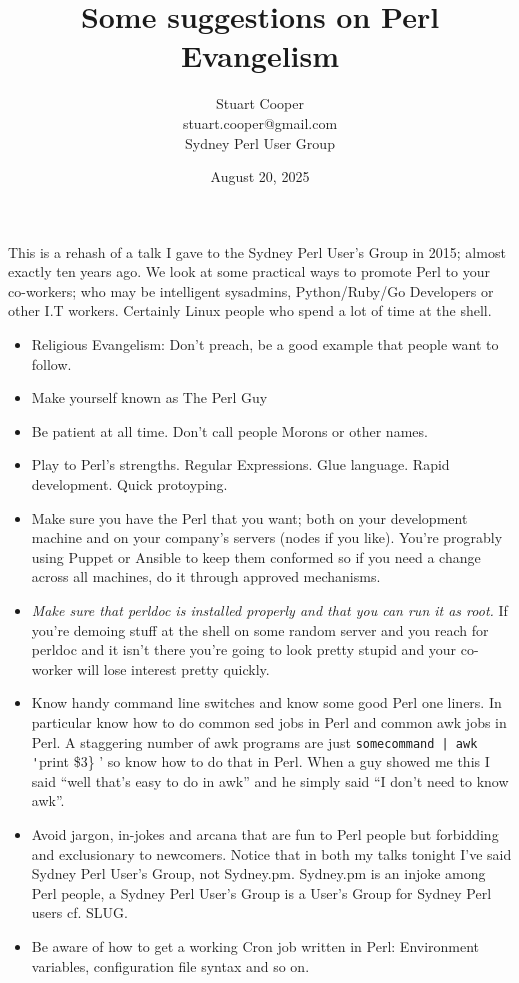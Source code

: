 \documentclass{article}      %
\title{Some suggestions on Perl Evangelism}
\author{Stuart Cooper\\stuart.cooper@gmail.com\\Sydney Perl User Group}
\date{August 20, 2025}
\begin{document}

\maketitle                   %

This is a rehash of a talk I gave to the Sydney Perl User's Group in
2015; almost exactly ten years ago. We look at some practical ways to
promote Perl to your co-workers; who may be intelligent sysadmins,
Python/Ruby/Go Developers or other I.T workers. Certainly Linux people
who spend a lot of time at the shell.

\begin{itemize}
  \item Religious Evangelism: Don't preach, be a good example that
    people want to follow.
  \item Make yourself known as The Perl Guy
  \item Be patient at all time. Don't call people Morons or other
    names. 
  \item Play to Perl's strengths. Regular Expressions. Glue
    language. Rapid development. Quick protoyping.
  \item Make sure you have the Perl that you want; both on your
    development machine and on your company's servers (nodes if you
    like). You're progrably using Puppet or Ansible to keep them
    conformed so if you need a change across all machines, do it
    through approved mechanisms.
  \item \emph{Make sure that \emph{perldoc} is installed properly and that
  you can run it as root.} If you're demoing stuff at the shell on some
    random server and you reach for perldoc and it isn't there you're
    going to look pretty stupid and your co-worker will lose interest
    pretty quickly.
  \item Know handy command line switches and know some good Perl one
    liners. In particular know how to do common sed jobs in Perl and
    common awk jobs in Perl. A staggering number of awk programs are
    just \verb{somecommand | awk '{print \$3\} ' so know how to do that
    in Perl. When a guy showed me this I said ``well that's easy to do
    in awk'' and he simply said ``I don't need to know awk''.
  \item Avoid jargon, in-jokes and arcana that are fun to Perl people
    but forbidding and exclusionary to newcomers. Notice that in both
    my talks tonight I've said Sydney Perl User's Group, not
    Sydney.pm. Sydney.pm is an injoke among Perl people, a Sydney Perl
    User's Group is a User's Group for Sydney Perl users cf. SLUG.
  \item Be aware of how to get a working Cron job written in Perl:
    Environment variables, configuration file syntax and so on.
\end{itemize}
\end{document}
